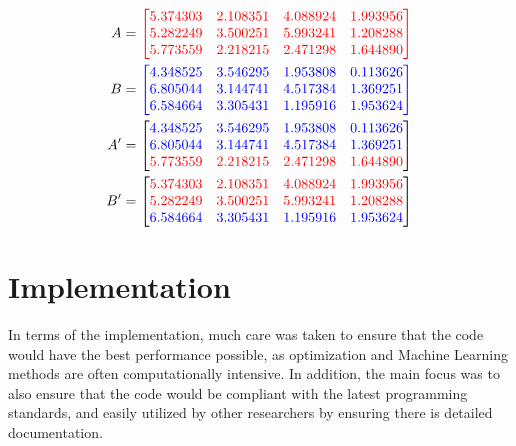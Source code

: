 \documentclass{article}
\begin{document}
\begin{align*}
A &= \textcolor{red}{\begin{bmatrix}
    5.374303   & 2.108351   & 4.088924   & 1.993956 \\
    5.282249   & 3.500251   & 5.993241   & 1.208288 \\
    5.773559   & 2.218215   & 2.471298   & 1.644890 
    \end{bmatrix}}\\
B &= \textcolor{blue}{\begin{bmatrix}
    4.348525   & 3.546295   & 1.953808   & 0.113626 \\
    6.805044   & 3.144741   & 4.517384   & 1.369251 \\
    6.584664   & 3.305431   & 1.195916   & 1.953624
    \end{bmatrix}}\\
A^{\prime} &= \begin{bmatrix}
    \color{blue}4.348525   & \color{blue}3.546295   & \color{blue}1.953808   & \color{blue}0.113626 \\
    \color{blue}6.805044   & \color{blue}3.144741   & \color{blue}4.517384   & \color{blue}1.369251 \\
    \color{red}5.773559   & \color{red}2.218215   & \color{red}2.471298   & \color{red}1.644890 
    \end{bmatrix}\\
B^{\prime} &= \begin{bmatrix}
    \color{red}5.374303   & \color{red}2.108351   & \color{red}4.088924   & \color{red}1.993956 \\
    \color{red}5.282249   & \color{red}3.500251   & \color{red}5.993241   & \color{red}1.208288 \\
    \color{blue}6.584664   & \color{blue}3.305431   & \color{blue}1.195916   & \color{blue}1.953624
    \end{bmatrix}
\end{align*}


\section{Implementation}

In terms of the implementation, much care was taken to ensure that the code would have the best performance possible, as optimization and Machine Learning methods are often computationally intensive. In addition, the main focus was to also ensure that the code would be compliant with the latest programming standards, and easily utilized by other researchers by ensuring there is detailed documentation.
\end{document}

